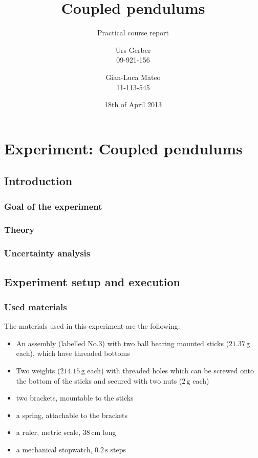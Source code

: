 \documentclass{scrreprt}
\author{Urs Gerber\\09-921-156 \and Gian-Luca Mateo\\11-113-545}
\date{18th of April 2013}
\title{Coupled pendulums}
\subtitle{Practical course report}
\newcommand{\unit}[1]{\ensuremath{\, \mathrm{#1}}}
\begin{document}
\maketitle

\tableofcontents
\newpage

\chapter{Experiment: Coupled pendulums}

\section{Introduction}

\subsection{Goal of the experiment}

\subsection{Theory}

\subsection{Uncertainty analysis}

\section{Experiment setup and execution}

\subsection{Used materials}
The materials used in this experiment are the following:
\begin{itemize}
\item An assembly (labelled No.$3$) with two ball bearing mounted sticks ($21.37\unit{g}$ each), which have threaded bottoms
\item Two weights ($214.15 \unit{g}$ each) with threaded holes which can be screwed onto the bottom of the sticks and secured with two nuts ($2\unit{g}$ each)
\item two brackets, mountable to the sticks
\item a spring, attachable to the brackets 
\item a ruler, metric scale, $38 \unit{cm}$ long
\item a mechanical stopwatch, $0.2 \unit{s}$ steps
\end{itemize}
\end{document}
